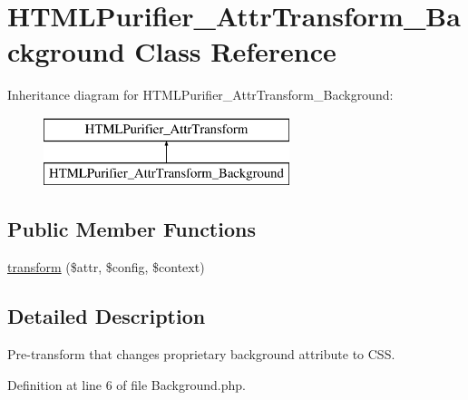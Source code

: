 \hypertarget{classHTMLPurifier__AttrTransform__Background}{\section{H\+T\+M\+L\+Purifier\+\_\+\+Attr\+Transform\+\_\+\+Background Class Reference}
\label{classHTMLPurifier__AttrTransform__Background}
}
Inheritance diagram for H\+T\+M\+L\+Purifier\+\_\+\+Attr\+Transform\+\_\+\+Background\+:\begin{figure}[H]
\begin{center}
\leavevmode
\includegraphics[height=2.000000cm]{classHTMLPurifier__AttrTransform__Background}
\end{center}
\end{figure}
\subsection*{Public Member Functions}
\begin{DoxyCompactItemize}
\item 
\hyperlink{classHTMLPurifier__AttrTransform__Background_a2ed0a7f520105e8ada7c1181bc89bbab}{transform} (\$attr, \$config, \$context)
\end{DoxyCompactItemize}


\subsection{Detailed Description}
Pre-\/transform that changes proprietary background attribute to C\+S\+S. 

Definition at line 6 of file Background.\+php.



